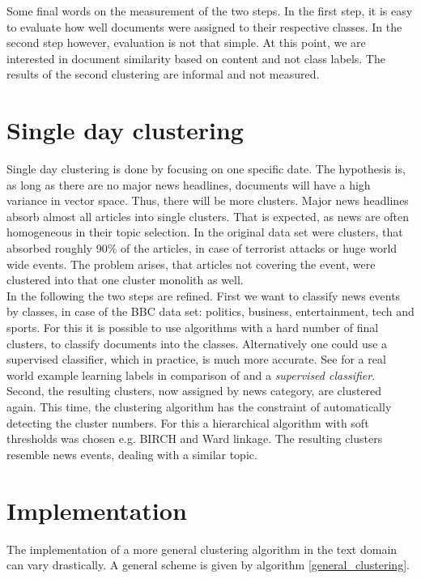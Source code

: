 Some final words on the measurement of the two steps. In the first step, it is easy to evaluate how well documents were assigned to their respective classes. In the second step however, evaluation is not that simple. At this point, we are interested in document similarity based on content and not class labels. The results of the second clustering are informal and not measured.

\section{Single day clustering}

Single day clustering is done by focusing on one specific date. The hypothesis is, as long as there are no major news headlines, documents will have a high variance in vector space. Thus, there will be more clusters. Major news headlines absorb almost all articles into single clusters. That is expected, as news are often homogeneous in their topic selection. In the original data set were clusters, that absorbed roughly 90\% of the articles, in case of terrorist attacks or huge world wide events. The problem arises, that articles not covering the event, were clustered into that one cluster monolith as well.\\

In the following the two steps are refined. First we want to classify news events by classes, in case of the BBC data set: politics, business, entertainment, tech and sports. For this it is possible to use algorithms with a hard number of final clusters, to classify documents into the classes. Alternatively one could use a supervised classifier, which in practice, is much more accurate. See \cite{LearningMultiLabelKmeans2013} for a real world example learning labels in comparison of \kmeans{} and a \emph{supervised classifier}. Second, the resulting clusters, now assigned by news category, are clustered again. This time, the clustering algorithm has the constraint of automatically detecting the cluster numbers. For this a hierarchical algorithm with soft thresholds was chosen e.g. BIRCH and Ward linkage. The resulting clusters resemble news events, dealing with a similar topic. 

\section{Implementation}
The implementation of a more general clustering algorithm in the text domain can vary drastically. A general scheme is given by algorithm \ref{general_clustering}.


